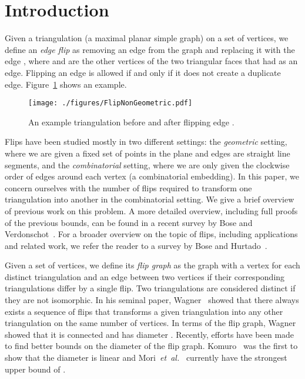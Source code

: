 \pdfoutput=1 \documentclass[12pt]{elsarticle}
\newcommand{\etal}{\emph{et~al.}\xspace}
\begin{document}
\section{Introduction}
\label{sec:introduction}

\noindent Given a triangulation (a maximal planar simple graph) on a set of  vertices, we define an \emph{edge flip} as removing an edge  from the graph and replacing it with the edge , where  and  are the other vertices of the two triangular faces that had  as an edge. Flipping an edge is allowed if and only if it does not create a duplicate edge. Figure~\ref{fig:flip} shows an example.

\begin{figure}[b]
 \centering
 \texttt{[image: ./figures/FlipNonGeometric.pdf]}
 \caption{An example triangulation before and after flipping edge .}
 \label{fig:flip}
\end{figure}

Flips have been studied mostly in two different settings: the \emph{geometric} setting, where we are given a fixed set of points in the plane and edges are straight line segments, and the \emph{combinatorial} setting, where we are only given the clockwise order of edges around each vertex (a combinatorial embedding). In this paper, we concern ourselves with the number of flips required to transform one triangulation into another in the combinatorial setting. We give a brief overview of previous work on this problem. A more detailed overview, including full proofs of the previous bounds, can be found in a recent survey by Bose and Verdonschot~\cite{bose2012history}. For a broader overview on the topic of flips, including applications and related work, we refer the reader to a survey by Bose and Hurtado~\cite{bose2009flips}.

Given a set of  vertices, we define its \emph{flip graph} as the graph with a vertex for each distinct triangulation and an edge between two vertices if their corresponding triangulations differ by a single flip. Two triangulations are considered distinct if they are not isomorphic. In his seminal paper, Wagner~\cite{wagner1936bemerkungenzum} showed that there always exists a sequence of  flips that transforms a given triangulation into any other triangulation on the same number of vertices. In terms of the flip graph, Wagner showed that it is connected and has diameter . Recently, efforts have been made to find better bounds on the diameter of the flip graph. Komuro~\cite{komuro1997diagonal} was the first to show that the diameter is linear and Mori~\etal~\cite{mori2003diagonal} currently have the strongest upper bound of .
\end{document}
